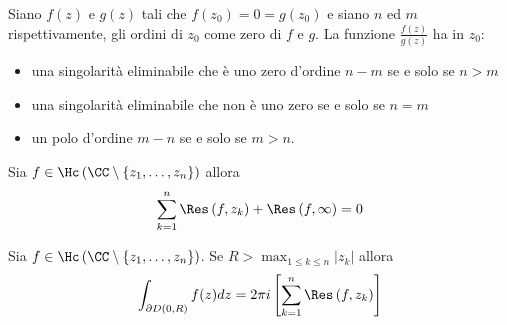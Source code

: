 \begin{thm}
Siano $f(z)$ e $g(z)$ tali che $f\left(z_{0}\right) = 0 = g\left(z_{0}\right)$ e siano $n$ ed $m$ rispettivamente, gli ordini di $z_{0}$ come zero di $f$ e $g$. La funzione $\frac{f(z)}{g(z)}$ ha in $z_{0}$:

\begin{itemize}
\item una singolarità eliminabile che è uno zero d'ordine $n - m$ se e solo se $n > m$
\item una singolarità eliminabile che non è uno zero se e solo se $n = m$
\item un polo d'ordine $m - n$ se e solo se $m > n$.
\end{itemize}
\end{thm}
\begin{thm}
Sia $f\in \Hc \left(\CC \setminus \left\{z_{1}, \dotsc, z_{n}\right\}\right)$ allora
\begin{equation*}
\sum\limits^{n}_{k = 1}\Res \left(f, z_{k}\right) + \Res \left(f, \infty \right) = 0
\end{equation*}
\end{thm}
\begin{thm}
Sia $f\in \Hc \left(\CC \setminus \left\{z_{1}, \dotsc, z_{n}\right\}\right)$. Se $R > \max_{1 \leq k \leq n}\left| z_{k}\right| $ allora
\begin{equation*}
\int\nolimits_{\partial D\left(0, R\right)} f(z) dz = 2\pi i\left[\sum\limits^{n}_{k = 1}\Res \left(f, z_{k}\right)\right]
\end{equation*}
\end{thm}
